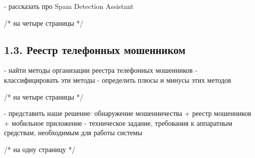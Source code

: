 - рассказать про Spam Detection Assistant

/* на четыре страницы */

\subsection*{1.3. Реестр телефонных мошенником}

- найти методы организации реестра телефонных мошенников
- классифицировать эти методы
- определить плюсы и минусы этих методов

/* на четыре страницы */

- представить наше решение: обнаружение мошенничества + реестр мошенников + мобильное приложение
- техническое задание, требования к аппаратным средствам, необходимым для работы системы

/* на одну страницу */

\newpage
